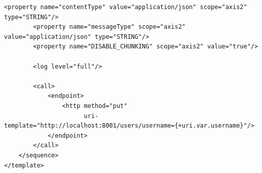 \begin{apendicesenv}
\begin{lstlisting}[caption={Conteúdo do arquivo "saveUser.xml".}]
        <property name="contentType" value="application/json" scope="axis2" type="STRING"/>
        <property name="messageType" scope="axis2" value="application/json" type="STRING"/>
        <property name="DISABLE_CHUNKING" scope="axis2" value="true"/>

        <log level="full"/>

        <call>
            <endpoint>
                <http method="put"
                      uri-template="http://localhost:8001/users/username={+uri.var.username}"/>
            </endpoint>
        </call>
    </sequence>
</template>
\end{lstlisting}



\end{apendicesenv}
